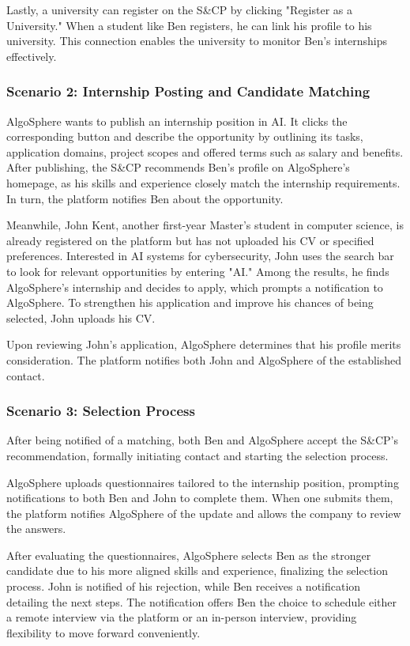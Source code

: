 Lastly, a university can register on the S\&CP by clicking "Register as a University." When a student like Ben registers, he can link his profile to his university. This connection enables the university to monitor Ben's internships effectively.

\subsubsection{Scenario 2: Internship Posting and Candidate Matching}
AlgoSphere wants to publish an internship position in AI. It clicks the corresponding button and describe the opportunity by outlining its tasks, application domains, project scopes and offered terms such as salary and benefits.
After publishing, the S\&CP recommends Ben’s profile on AlgoSphere’s homepage, as his skills and experience closely match the internship requirements.
In turn, the platform notifies Ben about the opportunity.

Meanwhile, John Kent, another first-year Master's student in computer science, is already registered on the platform but has not uploaded his CV or specified preferences.
Interested in AI systems for cybersecurity, John uses the search bar to look for relevant opportunities by entering "AI."
Among the results, he finds AlgoSphere’s internship and decides to apply, which prompts a notification to AlgoSphere.
To strengthen his application and improve his chances of being selected, John uploads his CV.

Upon reviewing John’s application, AlgoSphere determines that his profile merits consideration. The platform notifies both John and AlgoSphere of the established contact.

\subsubsection{Scenario 3: Selection Process}
After being notified of a matching, both Ben and AlgoSphere accept the S\&CP's recommendation, formally initiating contact and starting the selection process.

AlgoSphere uploads questionnaires tailored to the internship position, prompting notifications to both Ben and John to complete them. When one submits them, the platform notifies AlgoSphere of the update and allows the company to review the answers.

After evaluating the questionnaires, AlgoSphere selects Ben as the stronger candidate due to his more aligned skills and experience, finalizing the selection process. John is notified of his rejection, while Ben receives a notification detailing the next steps. The notification offers Ben the choice to schedule either a remote interview via the platform or an in-person interview, providing flexibility to move forward conveniently.

